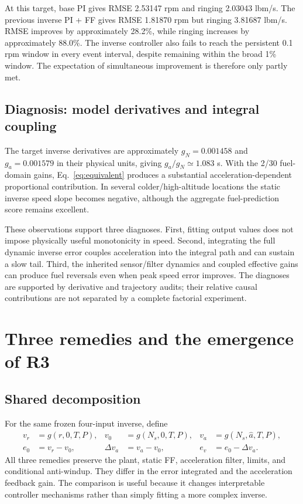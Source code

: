 At this target, base PI gives RMSE 2.53147 rpm and ringing 2.03043 lbm/s. The previous inverse PI + FF gives RMSE 1.81870 rpm but ringing 3.81687 lbm/s. RMSE improves by approximately 28.2\%, while ringing increases by approximately 88.0\%. The inverse controller also fails to reach the persistent 0.1 rpm window in every event interval, despite remaining within the broad 1\% window. The expectation of simultaneous improvement is therefore only partly met.


\section{Diagnosis: model derivatives and integral coupling}
The target inverse derivatives are approximately $g_N=0.001458$ and $g_a=0.001579$ in their physical units, giving $g_a/g_N\simeq1.083$ s. With the 2/30 fuel-domain gains, Eq.~\eqref{eq:equivalent} produces a substantial acceleration-dependent proportional contribution. In several colder/high-altitude locations the static inverse speed slope becomes negative, although the aggregate fuel-prediction score remains excellent.


These observations support three diagnoses. First, fitting output values does not impose physically useful monotonicity in speed. Second, integrating the full dynamic inverse error couples acceleration into the integral path and can sustain a slow tail. Third, the inherited sensor/filter dynamics and coupled effective gains can produce fuel reversals even when peak speed error improves. The diagnoses are supported by derivative and trajectory audits; their relative causal contributions are not separated by a complete factorial experiment.


\chapter{Three remedies and the emergence of R3}
\section{Shared decomposition}
For the same frozen four-input inverse, define
\begin{align}
v_r&=g(r,0,T,P),&v_0&=g(N_s,0,T,P),&v_a&=g(N_s,\hat a,T,P),\\
e_0&=v_r-v_0,&\Delta v_a&=v_a-v_0,&e_v&=e_0-\Delta v_a.
\end{align}
All three remedies preserve the plant, static FF, acceleration filter, limits, and conditional anti-windup. They differ in the error integrated and the acceleration feedback gain. The comparison is useful because it changes interpretable controller mechanisms rather than simply fitting a more complex inverse.

